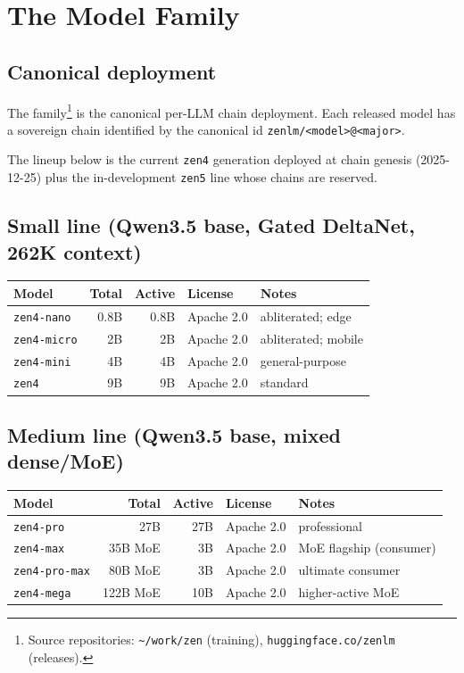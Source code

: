 \section{The \Zen{} Model Family}
\label{sec:zen}

\subsection{Canonical deployment}

The \Zen{} family\footnote{Source repositories: \texttt{\textasciitilde/work/zen} (training), \texttt{huggingface.co/zenlm} (releases).} is the canonical \Zoo{} per-LLM chain deployment. Each released \Zen{} model has a sovereign chain identified by the canonical id \texttt{zenlm/<model>@<major>}.

The lineup below is the current \texttt{zen4} generation deployed at chain genesis (2025-12-25) plus the in-development \texttt{zen5} line whose chains are reserved.

\subsection{Small line (Qwen3.5 base, Gated DeltaNet, 262K context)}

\begin{longtable}{p{3.5cm}rrlp{4cm}}
\toprule
\textbf{Model} & \textbf{Total} & \textbf{Active} & \textbf{License} & \textbf{Notes} \\
\midrule
\endhead
\texttt{zen4-nano} & 0.8B & 0.8B & Apache 2.0 & abliterated; edge \\
\texttt{zen4-micro} & 2B & 2B & Apache 2.0 & abliterated; mobile \\
\texttt{zen4-mini} & 4B & 4B & Apache 2.0 & general-purpose \\
\texttt{zen4} & 9B & 9B & Apache 2.0 & standard \\
\bottomrule
\end{longtable}

\subsection{Medium line (Qwen3.5 base, mixed dense/MoE)}

\begin{longtable}{p{3.5cm}rrlp{4cm}}
\toprule
\textbf{Model} & \textbf{Total} & \textbf{Active} & \textbf{License} & \textbf{Notes} \\
\midrule
\endhead
\texttt{zen4-pro} & 27B & 27B & Apache 2.0 & professional \\
\texttt{zen4-max} & 35B MoE & 3B & Apache 2.0 & MoE flagship (consumer) \\
\texttt{zen4-pro-max} & 80B MoE & 3B & Apache 2.0 & ultimate consumer \\
\texttt{zen4-mega} & 122B MoE & 10B & Apache 2.0 & higher-active MoE \\
\bottomrule
\end{longtable}

